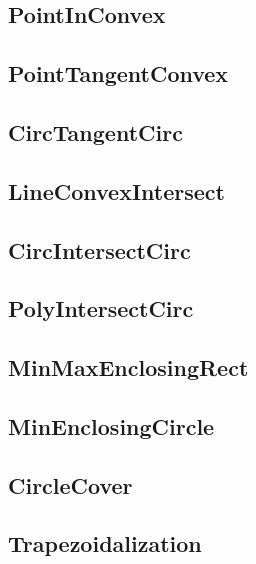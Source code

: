 	\subsection{PointInConvex}
	
	\subsection{PointTangentConvex}
	
	\subsection{CircTangentCirc}
	
	\subsection{LineConvexIntersect}
	
	\subsection{CircIntersectCirc}
	
	\subsection{PolyIntersectCirc}
	
	\subsection{MinMaxEnclosingRect}
	
	\subsection{MinEnclosingCircle}
	
	\subsection{CircleCover}
	
	\subsection{Trapezoidalization}
	
